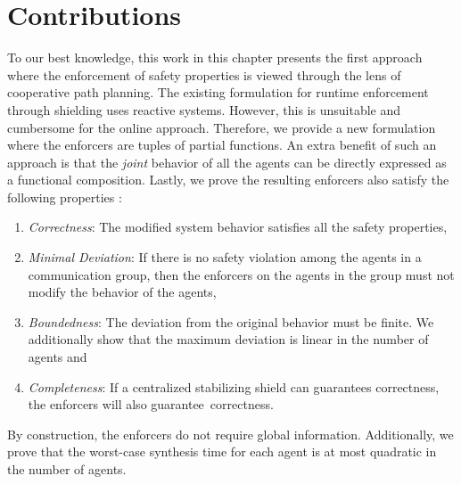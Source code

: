 \section{Contributions} To our best knowledge, this work in this chapter presents the first approach where the enforcement of safety properties is viewed through the lens of cooperative path planning. The existing formulation for runtime enforcement through shielding uses reactive systems. However, this is unsuitable and cumbersome for the online approach.  Therefore, we provide a new formulation where the enforcers are tuples of partial functions. An extra benefit of such an approach is that the \emph{joint} behavior of all the agents can be directly expressed as a functional composition. Lastly, we prove the resulting enforcers also satisfy the following properties \cite{bloem2014sat}:
\begin{enumerate}
    \item \emph{Correctness}: The modified system behavior satisfies all the safety properties,
    \item \emph{Minimal Deviation}:  If there is no safety violation among the agents in a communication group, then the enforcers on the agents in the group must not modify the behavior of the agents,
    \item \emph{Boundedness}:  The deviation from the original behavior must be finite. We additionally show that the maximum deviation is linear in the number of agents and
    \item \emph{Completeness}:  If a centralized stabilizing shield can guarantees correctness, the enforcers will also guarantee~correctness. 
\end{enumerate}
By construction, the enforcers do not require global information. Additionally, we prove that the worst-case synthesis time for each agent is at most quadratic in the number of agents.  

